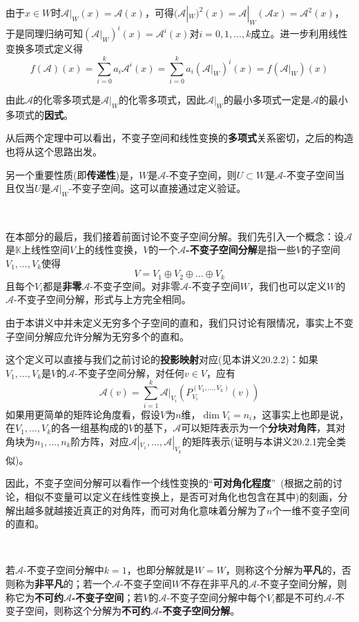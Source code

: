\documentclass[a4paper,UTF8,fontset=windows,AutoFakeBold]{ctexart}
\newcommand*{\ma}{\mathcal{A}}
\newcommand*{\note}{\noindent *}
\begin{document}
\begin{enumerate}
{        由于$x\in W$时$\ma|_W(x)=\ma(x)$，可得$(\ma|_W)^2(x)=\ma|_W(\ma x)=\ma^2(x)$，于是同理归纳可知$(\ma|_W)^i(x)=\ma^i(x)$对$i=0,1,\dots,k$成立。进一步利用线性变换多项式定义得
        $$f(\ma)(x)=\sum_{i=0}^ka_i\ma^i(x)=\sum_{i=0}^ka_i(\ma|_W)^i(x)=f(\ma|_W)(x)$$
    }

    \note 由此$\ma$的化零多项式是$\ma|_W$的化零多项式，因此$\ma|_W$的最小多项式一定是$\ma$的最小多项式的\textbf{因式}。
\end{enumerate}

\note 从后两个定理中可以看出，不变子空间和线性变换的\textbf{多项式}关系密切，之后的构造也将从这个思路出发。

\note 另一个重要性质(即\textbf{传递性})是，$W$是$\ma$-不变子空间，则$U\subset W$是$\ma$-不变子空间当且仅当$U$是$\ma|_W$-不变子空间。这可以直接通过定义验证。

\

在本部分的最后，我们接着前面讨论不变子空间分解。我们先引入一个概念：设$\ma$是$\mathbb{K}$上线性空间$V$上的线性变换，$V$的一个\textbf{$\ma$-不变子空间分解}是指一些$V$的子空间$V_1,\dots,V_k$使得
$$V=V_1\oplus V_2\oplus\dots\oplus V_k$$
且每个$V_i$都是\textbf{非零}$\ma$-不变子空间。对非零$\ma$-不变子空间$W$，我们也可以定义$W$的$\ma$-不变子空间分解，形式与上方完全相同。

\note 由于本讲义中并未定义无穷多个子空间的直和，我们只讨论有限情况，事实上不变子空间分解应允许分解为无穷多个的直和。

这个定义可以直接与我们之前讨论的\textbf{投影映射}对应(见本讲义20.2.2)：如果$V_1,\dots,V_k$是$V$的$\ma$-不变子空间分解，对任何$v\in V$，应有
$$\ma(v)=\sum_{i=1}^k\ma|_{V_i}(P_{V_i}^{(V_1,\dots,V_k)}(v))$$
如果用更简单的矩阵论角度看，假设$V$为$n$维，$\dim V_i=n_i$，这事实上也即是说，在$V_1,\dots,V_k$的各一组基构成的$V$的基下，$\ma$可以矩阵表示为一个\textbf{分块对角阵}，其对角块为$n_1,\dots,n_k$阶方阵，对应$\ma|_{V_1},\dots,\ma|_{V_k}$的矩阵表示(证明与本讲义20.2.1完全类似)。

\note 因此，不变子空间分解可以看作一个线性变换的``\textbf{可对角化程度}''\ (根据之前的讨论，相似不变量可以定义在线性变换上，是否可对角化也包含在其中)的刻画，分解出越多就越接近真正的对角阵，而可对角化意味着分解为了$n$个一维不变子空间的直和。

\

若$\ma$-不变子空间分解中$k=1$，也即分解就是$W=W$，则称这个分解为\textbf{平凡}的，否则称为\textbf{非平凡}的；若一个$\ma$-不变子空间$W$不存在非平凡的$\ma$-不变子空间分解，则称它为\textbf{不可约$\ma$-不变子空间}；若$V$的$\ma$-不变子空间分解中每个$V_i$都是不可约$\ma$-不变子空间，则称这个分解为\textbf{不可约$\ma$-不变子空间分解}。
\end{document}
